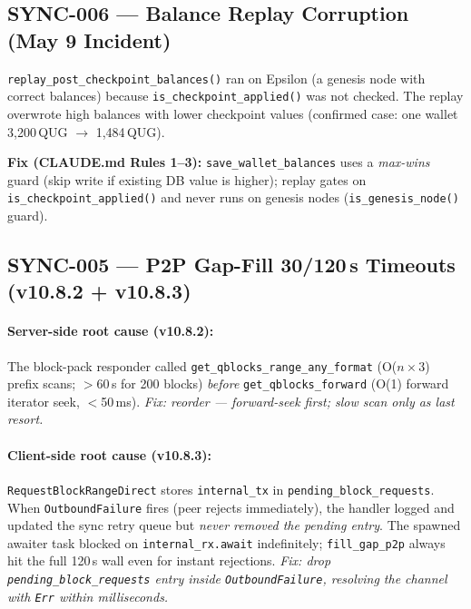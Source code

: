 \documentclass[12pt,a4paper]{article}
\begin{document}
\subsection{SYNC-006 — Balance Replay Corruption (May 9 Incident)}

\texttt{replay\_post\_checkpoint\_balances()} ran on Epsilon (a genesis node with
correct balances) because \texttt{is\_checkpoint\_applied()} was not checked.
The replay overwrote high balances with lower checkpoint values
(confirmed case: one wallet 3,200\,QUG $\rightarrow$ 1,484\,QUG).

\textbf{Fix (CLAUDE.md Rules 1--3):} \texttt{save\_wallet\_balances} uses a
\emph{max-wins} guard (skip write if existing DB value is higher); replay gates on
\texttt{is\_checkpoint\_applied()} and never runs on genesis nodes
(\texttt{is\_genesis\_node()} guard).

\subsection{SYNC-005 — P2P Gap-Fill 30/120\,s Timeouts (v10.8.2 + v10.8.3)}

\paragraph{Server-side root cause (v10.8.2):}
The block-pack responder called \texttt{get\_qblocks\_range\_any\_format}
(O($n \times 3$) prefix scans; $>$60\,s for 200 blocks) \emph{before}
\texttt{get\_qblocks\_forward} (O(1) forward iterator seek, $<$50\,ms).
\emph{Fix: reorder — forward-seek first; slow scan only as last resort.}

\paragraph{Client-side root cause (v10.8.3):}
\texttt{RequestBlockRangeDirect} stores \texttt{internal\_tx} in
\texttt{pending\_block\_requests}.
When \texttt{OutboundFailure} fires (peer rejects immediately), the handler logged
and updated the sync retry queue but \emph{never removed the pending entry}.
The spawned awaiter task blocked on \texttt{internal\_rx.await} indefinitely;
\texttt{fill\_gap\_p2p} always hit the full 120\,s wall even for instant rejections.
\emph{Fix: drop \texttt{pending\_block\_requests} entry inside \texttt{OutboundFailure},
resolving the channel with \texttt{Err} within milliseconds.}

\end{document}
